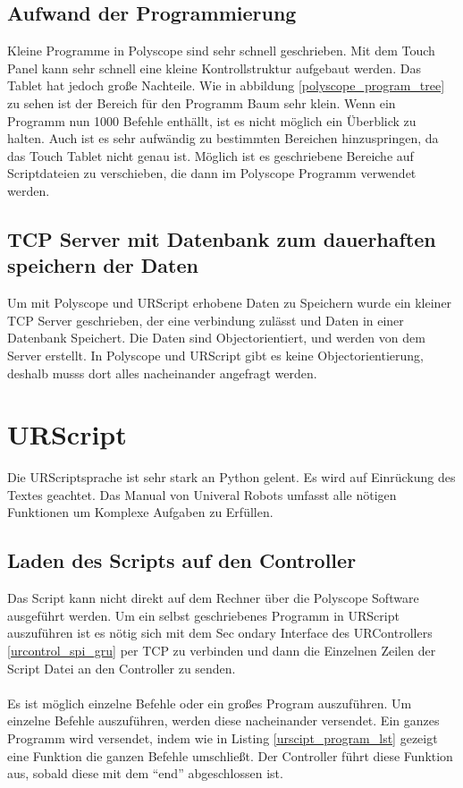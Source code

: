\subsection{Aufwand der Programmierung}
\label{polyscope_aufwand}

Kleine Programme in Polyscope sind sehr schnell geschrieben. Mit dem Touch Panel kann sehr schnell eine kleine Kontrollstruktur aufgebaut werden. Das Tablet hat jedoch große Nachteile. Wie in abbildung \ref{polyscope_program_tree} zu sehen ist der Bereich für den Programm Baum sehr klein. Wenn ein Programm nun 1000 Befehle enthällt, ist es nicht möglich ein Überblick zu halten. Auch ist es sehr aufwändig zu bestimmten Bereichen hinzuspringen, da das Touch Tablet nicht genau ist. Möglich ist es geschriebene Bereiche auf Scriptdateien zu verschieben, die dann im Polyscope Programm verwendet werden. 

\subsection{TCP Server mit Datenbank zum dauerhaften speichern der Daten}
\label{tcp_datentank_sicherung_rel}

Um mit Polyscope und URScript erhobene Daten zu Speichern wurde ein kleiner TCP Server geschrieben, der eine verbindung zulässt und Daten in einer Datenbank Speichert. Die Daten sind Objectorientiert, und werden von dem Server erstellt. 
In Polyscope und URScript gibt es keine Objectorientierung, deshalb musss dort alles nacheinander angefragt werden. 


\section{URScript}
\label{sec:ur_script_rel}

Die URScriptsprache ist sehr stark an Python gelent. Es wird auf Einrückung des Textes geachtet.
Das Manual von Univeral Robots umfasst alle nötigen Funktionen um Komplexe Aufgaben zu Erfüllen.

\subsection{Laden des Scripts auf den Controller}
\label{load_script_rel}

Das Script kann nicht direkt auf dem Rechner über die Polyscope Software ausgeführt werden. Um ein selbst geschriebenes Programm in URScript auszuführen ist es nötig sich mit dem Sec
ondary Interface des URControllers \ref{urcontrol_spi_gru} per TCP zu verbinden und dann die Einzelnen Zeilen der Script Datei an den Controller zu senden.
\\\\
Es ist möglich einzelne Befehle oder ein großes Program auszuführen. Um einzelne Befehle auszuführen, werden diese nacheinander versendet.
Ein ganzes Programm wird versendet, indem wie in Listing \ref{urscipt_program_lst} gezeigt eine Funktion die ganzen Befehle umschließt. Der Controller führt diese Funktion aus, sobald diese mit dem ``end'' abgeschlossen ist.

